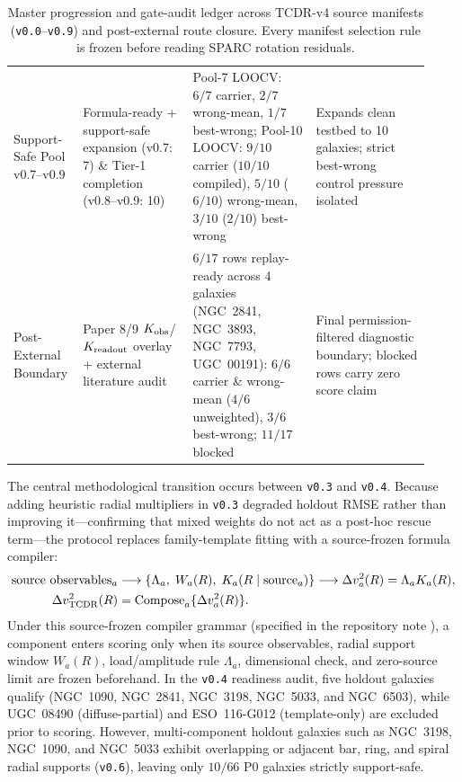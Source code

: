 \documentclass[11pt]{article}
\begin{document}
\begin{table}[htbp]
\begin{tabular}{L{0.12\linewidth}L{0.25\linewidth}L{0.29\linewidth}L{0.26\linewidth}}
Support-Safe Pool v0.7--v0.9 & Formula-ready + support-safe expansion (v0.7: 7) \& Tier-1 completion (v0.8--v0.9: 10) & Pool-7 LOOCV: \(6/7\) carrier, \(2/7\) wrong-mean, \(1/7\) best-wrong; Pool-10 LOOCV: \(9/10\) carrier (\(10/10\) compiled), \(5/10\) (\(6/10\)) wrong-mean, \(3/10\) (\(2/10\)) best-wrong & Expands clean testbed to 10 galaxies; strict best-wrong control pressure isolated\\
Post-External Boundary & Paper 8/9 \(K_{\rm obs}\)/\(K_{\rm readout}\) overlay + external literature audit \cite{DamasSegovia2012Bulgeless,DiazGarcia2020SFbars,Murugeshan2020AngularMomentum} & \(6/17\) rows replay-ready across 4 galaxies (NGC~2841, NGC~3893, NGC~7793, UGC~00191): \(6/6\) carrier \& wrong-mean (\(4/6\) unweighted), \(3/6\) best-wrong; \(11/17\) blocked & Final permission-filtered diagnostic boundary; blocked rows carry zero score claim\\
\bottomrule
\end{tabular}
\caption{Master progression and gate-audit ledger across TCDR-v4 source
manifests (\texttt{v0.0}--\texttt{v0.9}) and post-external route closure.  Every manifest
selection rule is frozen before reading SPARC rotation residuals.}
\label{tab:master-progression-ledger}
\end{table}

The central methodological transition occurs between \texttt{v0.3} and \texttt{v0.4}.
Because adding heuristic radial multipliers in \texttt{v0.3} degraded holdout RMSE
rather than improving it---confirming that mixed weights do not act as a
post-hoc rescue term---the protocol replaces family-template fitting with a
source-frozen formula compiler:
\begin{align}
  {\rm source\ observables}_a
  &\longrightarrow
  \{\Lambda_a,\;W_a(R),\;K_a(R\mid {\rm source}_a)\}
  \longrightarrow
  \Delta v_a^2(R)=\Lambda_a K_a(R),\\
  \Delta v_{\rm TCDR}^2(R)
  &=\operatorname{Compose}_a\{\Delta v_a^2(R)\}.
\end{align}
Under this source-frozen compiler grammar (specified in the repository note
),
a component enters scoring only when its source observables, radial support
window \(W_a(R)\), load/amplitude rule \(\Lambda_a\), dimensional check, and
zero-source limit are frozen beforehand.  In the \texttt{v0.4} readiness audit, five
holdout galaxies qualify (NGC~1090, NGC~2841, NGC~3198, NGC~5033, and NGC~6503),
while UGC~08490 (diffuse-partial) and ESO~116-G012 (template-only) are excluded
prior to scoring.  However, multi-component holdout galaxies such as NGC~3198,
NGC~1090, and NGC~5033 exhibit overlapping or adjacent bar, ring, and spiral
radial supports (\texttt{v0.6}), leaving only \(10/66\) P0 galaxies strictly
support-safe.
\end{document}

